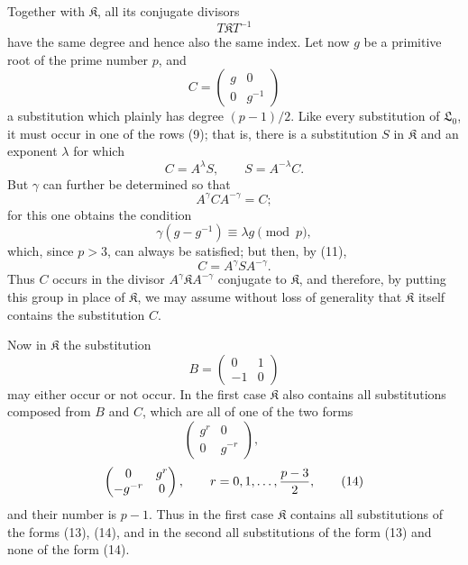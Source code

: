 \documentclass[11pt]{article}
\providecommand{\Lzero}{\mathfrak L_0}
\providecommand{\Kgrp}{\mathfrak K}
\begin{document}
Together with $\Kgrp$, all its conjugate divisors
\[
 T\Kgrp T^{-1}
\]
have the same degree and hence also the same index. Let now $g$ be a primitive root of the prime number $p$, and
\begin{equation}
 C=\begin{pmatrix}g&0\\0&g^{-1}\end{pmatrix}
\tag{10}
\end{equation}
a substitution which plainly has degree $(p-1)/2$. Like every substitution of $\Lzero$, it must occur in one of the rows (9); that is, there is a substitution $S$ in $\Kgrp$ and an exponent $\lambda$ for which
\begin{equation}
 C=A^\lambda S,\qquad S=A^{-\lambda}C.
\tag{11}
\end{equation}
But $\gamma$ can further be determined so that
\begin{equation}
 A^\gamma C A^{-\gamma}=C;
\tag{12}
\end{equation}
for this one obtains the condition
\[
 \gamma(g-g^{-1})\equiv\lambda g\pmod p,
\]
which, since $p>3$, can always be satisfied; but then, by (11),
\[
 C=A^\gamma S A^{-\gamma}.
\]
Thus $C$ occurs in the divisor $A^\gamma\Kgrp A^{-\gamma}$ conjugate to $\Kgrp$, and therefore, by putting this group in place of $\Kgrp$, we may assume without loss of generality that $\Kgrp$ itself contains the substitution $C$.

Now in $\Kgrp$ the substitution
\[
 B=\begin{pmatrix}0&1\\-1&0\end{pmatrix}
\]
may either occur or not occur. In the first case $\Kgrp$ also contains all substitutions composed from $B$ and $C$, which are all of one of the two forms
\begin{equation}
 \begin{pmatrix}g^r&0\\0&g^{-r}\end{pmatrix},\qquad
\tag{13}
\end{equation}
\begin{equation}
 \begin{pmatrix}0&g^r\\-g^{-r}&0\end{pmatrix},
 \qquad r=0,1,\ldots,{p-3\over2},
\tag{14}
\end{equation}
and their number is $p-1$. Thus in the first case $\Kgrp$ contains all substitutions of the forms (13), (14), and in the second all substitutions of the form (13) and none of the form (14).
\end{document}
